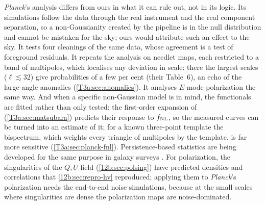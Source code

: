 \begin{inpractice}
\textit{Planck}'s analysis differs from ours in what it can rule out, not in its logic. Its simulations follow the
data through the real instrument and the real component separation, so a non-Gaussianity created by the pipeline is in
the null distribution and cannot be mistaken for the sky; ours would attribute such an effect to the sky. It tests
four cleanings of the same data, whose agreement is a test of foreground residuals. It repeats the analysis on needlet
maps, each restricted to a band of multipoles, which localises any deviation in scale: there the largest scales
($\ell\lesssim32$) give probabilities of a few per cent (their Table~6), an echo of the large-angle anomalies
(\cref{T3a:sec:anomalies}). It analyses $E$-mode polarization the same way. And when a specific non-Gaussian model is
in mind, the functionals are fitted rather than only tested: the first-order expansion of \cite{Matsubara2003}
(\cref{T3a:sec:matsubara}) predicts their response to $f_{\rm NL}$, so the measured curves can be turned into an
estimate of it; for a known three-point template the bispectrum, which weights every triangle of multipoles by the
template, is far more sensitive (\cref{T3a:sec:planck-fnl}). Persistence-based statistics are being developed for the same
purpose in galaxy surveys \cite{Biagetti2021}. For polarization, the singularities of the $Q,U$ field
(\cref{12b:sec:polsing}) have predicted densities and correlations \cite{VachaspatiLue2003,HutererVachaspati2005}
that \cref{12b:sec:repro-hv} reproduced; applying them to \textit{Planck}'s polarization needs the end-to-end noise
simulations, because at the small scales where singularities are dense the polarization maps are noise-dominated.
\end{inpractice}


